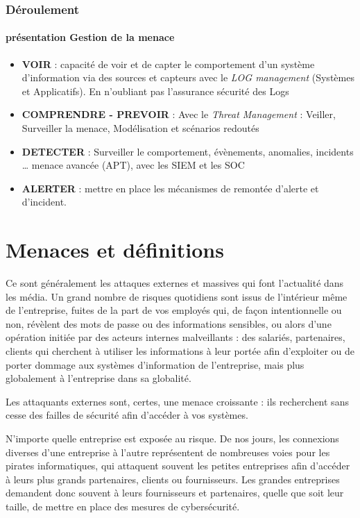 \begin{frame}
\frametitle<presentation>{Déroulement}
\framesubtitle<presentation>{présentation Gestion de la menace}
\begin{itemize}
  \item \textbf{VOIR} :  capacité de voir et de capter le comportement d'un système d'information via des sources et capteurs avec le \textit{LOG management} (Systèmes et Applicatifs). En n'oubliant pas l'assurance sécurité des Logs
\item \textbf{COMPRENDRE - PREVOIR} : Avec le \textit{Threat Management} : Veiller, Surveiller la menace, Modélisation et scénarios redoutés
\item \textbf{DETECTER} : Surveiller le comportement, 
évènements, anomalies, incidents … menace avancée (APT), avec les SIEM et les SOC
\item \textbf{ALERTER} : mettre en place les mécanismes de remontée d'alerte et d'incident.

\end{itemize}

\end{frame}

\section{Menaces et définitions}

Ce sont généralement les attaques externes et massives qui font l’actualité dans les média. Un grand nombre de risques quotidiens sont issus de l'intérieur même de l'entreprise,  fuites de la part de vos employés qui, de façon intentionnelle ou non, révèlent des mots de passe ou des informations sensibles, ou alors d’une opération initiée par des acteurs internes malveillants : des salariés, partenaires, clients qui cherchent à utiliser les informations à leur portée afin d’exploiter ou de porter dommage aux systèmes d'information de l’entreprise, mais plus globalement à l'entreprise dans sa globalité.

Les attaquants externes sont, certes, une menace croissante : ils recherchent sans cesse des failles de sécurité afin d’accéder à vos systèmes.

N’importe quelle entreprise est exposée au risque. De nos jours, les connexions diverses d’une entreprise à l’autre représentent de nombreuses voies pour les pirates informatiques, qui attaquent souvent les petites entreprises afin d’accéder à leurs plus grands partenaires, clients ou fournisseurs. Les grandes entreprises demandent donc souvent à leurs fournisseurs et partenaires, quelle que soit leur taille, de mettre en place des mesures de cybersécurité.



